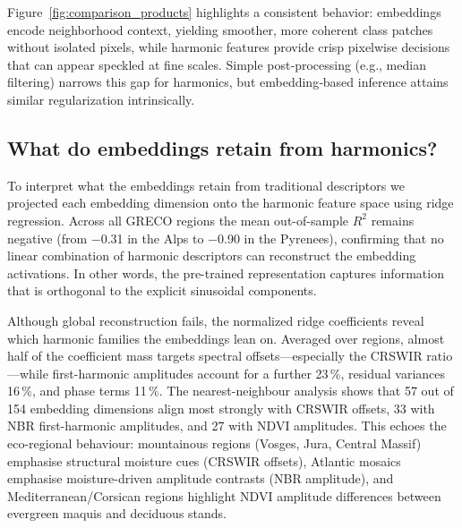 \documentclass[utf8]{FrontiersinHarvard}
\begin{document}
Figure~\ref{fig:comparison_products} highlights a consistent behavior: embeddings encode neighborhood context, yielding smoother, more coherent class patches without isolated pixels, while harmonic features provide crisp pixelwise decisions that can appear speckled at fine scales. Simple post‑processing (e.g., median filtering) narrows this gap for harmonics, but embedding‑based inference attains similar regularization intrinsically.

\subsection{What do embeddings retain from harmonics?}

To interpret what the embeddings retain from traditional descriptors we projected each embedding dimension onto the harmonic feature space using ridge regression. Across all GRECO regions the mean out-of-sample \(R^2\) remains negative (from −0.31 in the Alps to −0.90 in the Pyrenees), confirming that no linear combination of harmonic descriptors can reconstruct the embedding activations. In other words, the pre-trained representation captures information that is orthogonal to the explicit sinusoidal components.

Although global reconstruction fails, the normalized ridge coefficients reveal which harmonic families the embeddings lean on. Averaged over regions, almost half of the coefficient mass targets spectral offsets—especially the CRSWIR ratio—while first-harmonic amplitudes account for a further 23\,\%, residual variances 16\,\%, and phase terms 11\,\%. The nearest-neighbour analysis shows that 57 out of 154 embedding dimensions align most strongly with CRSWIR offsets, 33 with NBR first-harmonic amplitudes, and 27 with NDVI amplitudes. This echoes the eco-regional behaviour: mountainous regions (Vosges, Jura, Central Massif) emphasise structural moisture cues (CRSWIR offsets), Atlantic mosaics emphasise moisture-driven amplitude contrasts (NBR amplitude), and Mediterranean/Corsican regions highlight NDVI amplitude differences between evergreen maquis and deciduous stands.
\end{document}
